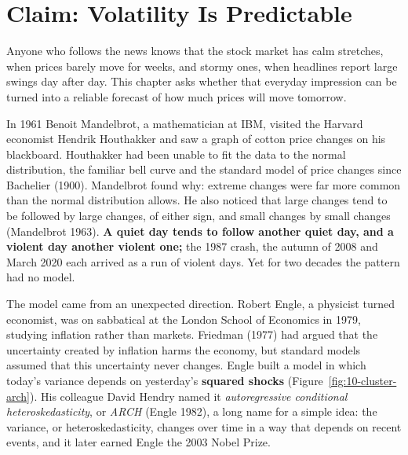 \makeatletter
{}
\makeatother

\chapter{Claim: Volatility Is Predictable}
\label{ch:07}
\providecommand{\term}[1]{\emph{#1}}

Anyone who follows the news knows that the stock market has calm stretches, when prices barely move for weeks, and stormy ones, when headlines report large swings day after day. This chapter asks whether that everyday impression can be turned into a reliable forecast of how much prices will move tomorrow.

In 1961 Benoit Mandelbrot, a mathematician at IBM, visited the Harvard economist Hendrik Houthakker and saw a graph of cotton price changes on his blackboard. Houthakker had been unable to fit the data to the normal distribution, the familiar bell curve and the standard model of price changes since Bachelier (1900). Mandelbrot found why: extreme changes were far more common than the normal distribution allows. He also noticed that large changes tend to be followed by large changes, of either sign, and small changes by small changes (Mandelbrot 1963). \textbf{A quiet day tends to follow another quiet day, and a violent day another violent one;} the 1987 crash, the autumn of 2008 and March 2020 each arrived as a run of violent days. Yet for two decades the pattern had no model.

The model came from an unexpected direction. Robert Engle, a physicist turned economist, was on sabbatical at the London School of Economics in 1979, studying inflation rather than markets. Friedman (1977) had argued that the uncertainty created by inflation harms the economy, but standard models assumed that this uncertainty never changes. Engle built a model in which today's variance depends on yesterday's \textbf{squared shocks} (Figure~\ref{fig:10-cluster-arch}). His colleague David Hendry named it \term{autoregressive conditional heteroskedasticity}, or \term{ARCH} (Engle 1982), a long name for a simple idea: the variance, or heteroskedasticity, changes over time in a way that depends on recent events, and it later earned Engle the 2003 Nobel Prize.


